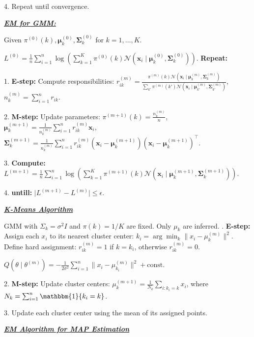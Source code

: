 \documentclass[10pt]{article}
\newcommand{\bulletPoint}[1]{\ul{\textit{\textbf{#1}}}}
\begin{document}
\begin{multicols*}{3}
4. Repeat until convergence.

\bulletPoint{EM for GMM:}\quad

Given $\pi^{(0)}(k), \boldsymbol{\mu}_k^{(0)}, \boldsymbol{\Sigma}_k^{(0)}$ for $k=1,\dots,K$. 

$L^{(0)} = \frac{1}{n} \sum_{i=1}^{n} \log \left( \sum_{k=1}^{K} \pi^{(0)}(k) \mathcal{N} (\mathbf{x}_i \mid \boldsymbol{\mu}_k^{(0)}, \boldsymbol{\Sigma}_k^{(0)}) \right)$. 
\textbf{Repeat:}

1. \textbf{E-step:} Compute responsibilities:
    $r_{ik}^{(m)} = \frac{\pi^{(m)}(k) \mathcal{N} (\mathbf{x}_i \mid \boldsymbol{\mu}_k^{(m)}, \boldsymbol{\Sigma}_k^{(m)})}{\sum_{k'} \pi^{(m)}(k') \mathcal{N} (\mathbf{x}_i \mid \boldsymbol{\mu}_{k'}^{(m)}, \boldsymbol{\Sigma}_{k'}^{(m)})}$,  
    $n_k^{(m)} = \sum_{i=1}^{n} r_{ik}$. 
    
2. \textbf{M-step:} Update parameters:
    $\pi^{(m+1)}(k) = \frac{n_k^{(m)}}{n}$,  \quad
    $\boldsymbol{\mu}_k^{(m+1)} = \frac{1}{n_k^{(m)}} \sum_{i=1}^{n} r_{ik}^{(m)} \mathbf{x}_i$,  \quad
    $\boldsymbol{\Sigma}_k^{(m+1)} = \frac{1}{n_k^{(m)}} \sum_{i=1}^{n} r_{ik}^{(m)} (\mathbf{x}_i - \boldsymbol{\mu}_k^{(m+1)})(\mathbf{x}_i - \boldsymbol{\mu}_k^{(m+1)})^\top$. 

3. \textbf{Compute:}
    $L^{(m+1)} = \frac{1}{n} \sum_{i=1}^{n} \log \left( \sum_{k=1}^{K} \pi^{(m+1)}(k) \mathcal{N} (\mathbf{x}_i \mid \boldsymbol{\mu}_k^{(m+1)}, \boldsymbol{\Sigma}_k^{(m+1)}) \right)$. 

4. \textbf{untill:} $\lvert L^{(m+1)} - L^{(m)} \rvert \leq \epsilon$.
    

\bulletPoint{K-Means Algorithm}\quad

GMM with $\Sigma_k = \sigma^2 I$ and $\pi(k) = 1/K$ are fixed. Only $\mu_k$ are inferred. . \textbf{E-step:} Assign each $x_i$ to its nearest cluster center: $k_i = \arg\min_{k} \|x_i - \mu_k^{(m)}\|^2$. Define hard assignment: $r_{ik}^{(m)} = 1$ if $k = k_i$, otherwise $r_{ik}^{(m)} = 0$. 

$Q(\theta \mid \theta^{(m)}) = -\frac{1}{2\sigma^2} \sum_{i=1}^{n} \|x_i - \mu_{k_i}^{(m)}\|^2 + \text{const}$. 

2. \textbf{M-step:} Update cluster centers: $\mu_k^{(m+1)} = \frac{1}{N_k} \sum_{i:k_i=k} x_i$, where $N_k = \sum_{i=1}^{n} \mathbbm{1}\{ k_i = k \}$. 

3. Update each cluster center using the mean of its assigned points.
    
\bulletPoint{EM Algorithm for MAP Estimation}\quad


\end{multicols*}
\end{document}
